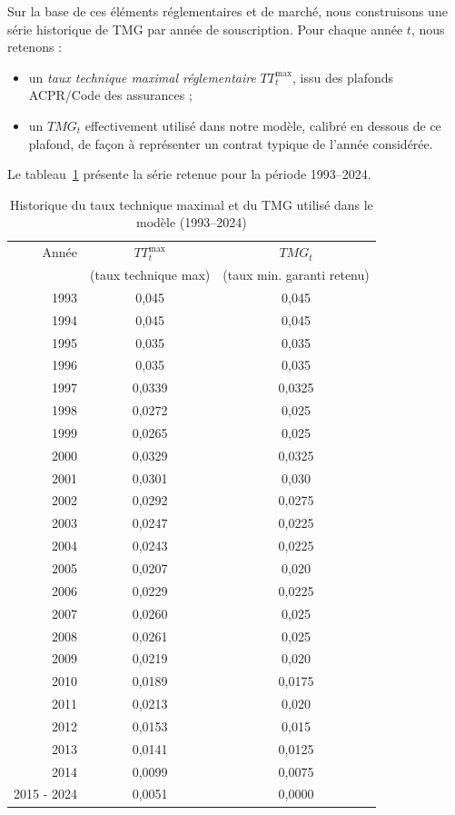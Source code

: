Sur la base de ces éléments réglementaires et de marché, nous construisons une série historique de TMG par année de souscription. Pour chaque année $t$, nous retenons :
\begin{itemize}
  \item un \emph{taux technique maximal réglementaire} $TT^{\max}_t$, issu des plafonds ACPR/Code des assurances ;
  \item un $TMG_t$ effectivement utilisé dans notre modèle, calibré en dessous de ce plafond, de façon à représenter un contrat typique de l'année considérée.
\end{itemize}

Le tableau~\ref{tab:TMG_historique} présente la série retenue pour la période 1993--2024.

\begin{table}[H]
  \centering
  \caption{Historique du taux technique maximal et du TMG utilisé dans le modèle (1993--2024)}
  \label{tab:TMG_historique}
  \begin{tabular}{rcc}
    \hline
    Année & $TT^{\max}_t$ & $TMG_t$ \\
          & (taux technique max) & (taux min. garanti retenu) \\
    \hline
    1993 & 0{,}045  & 0{,}045 \\
    1994 & 0{,}045  & 0{,}045 \\
    1995 & 0{,}035  & 0{,}035 \\
    1996 & 0{,}035  & 0{,}035 \\
    1997 & 0{,}0339 & 0{,}0325 \\
    1998 & 0{,}0272 & 0{,}025  \\
    1999 & 0{,}0265 & 0{,}025  \\
    2000 & 0{,}0329 & 0{,}0325 \\
    2001 & 0{,}0301 & 0{,}030  \\
    2002 & 0{,}0292 & 0{,}0275 \\
    2003 & 0{,}0247 & 0{,}0225 \\
    2004 & 0{,}0243 & 0{,}0225 \\
    2005 & 0{,}0207 & 0{,}020  \\
    2006 & 0{,}0229 & 0{,}0225 \\
    2007 & 0{,}0260 & 0{,}025  \\
    2008 & 0{,}0261 & 0{,}025  \\
    2009 & 0{,}0219 & 0{,}020  \\
    2010 & 0{,}0189 & 0{,}0175 \\
    2011 & 0{,}0213 & 0{,}020  \\
    2012 & 0{,}0153 & 0{,}015  \\
    2013 & 0{,}0141 & 0{,}0125 \\
    2014 & 0{,}0099 & 0{,}0075 \\
    2015 - 2024 & 0{,}0051 & 0{,}0000 \\
    \hline
  \end{tabular}
\end{table}


